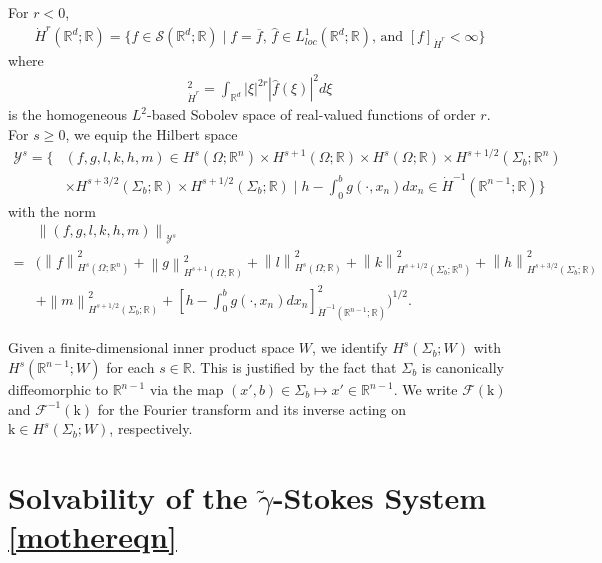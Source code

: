 \documentclass[11pt,letterpaper,reqno]{amsart}
\numberwithin{equation}{section}
\newcommand{\abs}[1]{\left\lvert#1\right\rvert}
\newcommand{\norm}[1]{\left\lVert#1\right\rVert}
\begin{document}
For \(r<0\),
\begin{align} \label{hdspace}
    \dot{H}^{r}(\mathbb{R}^{d};\mathbb{R}) = \{f \in \mathscr{S}(\mathbb{R}^{d};\mathbb{R}) \mid \mbox{\(f=\overline{f}\), \(\hat{f} \in L^{1}_{loc}(\mathbb{R}^{d};\mathbb{R})\), and \([f]_{\dot{H}^{r}}<\infty\)}\}
\end{align}
where
\begin{align}
    [f]^{2}_{\dot{H}^{r}}=\int_{\mathbb{R}^{d}}\abs{\xi}^{2r}\abs{\hat{f}(\xi)}^{2}d\xi
\end{align}
is the homogeneous \(L^{2}\)-based Sobolev space of real-valued functions of order \(r\).
For \(s \geq 0\), we equip the Hilbert space
\begin{align} \label{Ys}
    \mathcal{Y}^{s}=\biggl\{&(f,g,l,k,h,m) \in H^{s}(\Omega;\mathbb{R}^{n}) \times H^{s+1}(\Omega;\mathbb{R}) \times H^{s}(\Omega;\mathbb{R}) \times H^{s+1/2}(\Sigma_{b};\mathbb{R}^{n}) \nonumber \\
    &\times H^{s+3/2}(\Sigma_{b};\mathbb{R}) \times H^{s+1/2}(\Sigma_{b};\mathbb{R}) \mid h-\int_{0}^{b}g(\cdot,x_{n})dx_{n}\in \dot{H}^{-1}(\mathbb{R}^{n-1};\mathbb{R})\biggr\}
\end{align}
with the norm
\begin{align}
    &\norm{(f,g,l,k,h,m)}_{\mathcal{Y}^{s}} \nonumber \\
    =&\biggl(\norm{f}^{2}_{H^{s}(\Omega;\mathbb{R}^{n})}+\norm{g}^{2}_{H^{s+1}(\Omega;\mathbb{R})}+\norm{l}^{2}_{H^{s}(\Omega;\mathbb{R})}+\norm{k}^{2}_{H^{s+1/2}(\Sigma_{b};\mathbb{R}^{n})}+\norm{h}^{2}_{H^{s+3/2}(\Sigma_{b};\mathbb{R})} \nonumber \\
    &+\norm{m}^{2}_{H^{s+1/2}(\Sigma_{b};\mathbb{R})}+\left[h-\int_{0}^{b}g(\cdot,x_{n})dx_{n}\right]_{\dot{H}^{-1}(\mathbb{R}^{n-1};\mathbb{R})}^{2}\biggr)^{1/2}.
\end{align}

Given a finite-dimensional inner product space \(W\), we identify \(H^{s}(\Sigma_{b};W)\) with \(H^{s}(\mathbb{R}^{n-1};W)\) for each \(s \in \mathbb{R}\). This is justified by the fact that \(\Sigma_{b}\) is canonically diffeomorphic to \(\mathbb{R}^{n-1}\) via the map \((x',b) \in \Sigma_{b} \mapsto x' \in \mathbb{R}^{n-1}\). We write \(\mathcal{F}(\mathrm{k})\) and \(\mathcal{F}^{-1}(\mathrm{k})\) for the Fourier transform and its inverse acting on \(\mathrm{k} \in H^{s}(\Sigma_{b};W)\), respectively.

\section{Solvability of the \(\widetilde{\gamma}\)-Stokes System \eqref{mothereqn}} \label{gstokesadj}
\end{document}
